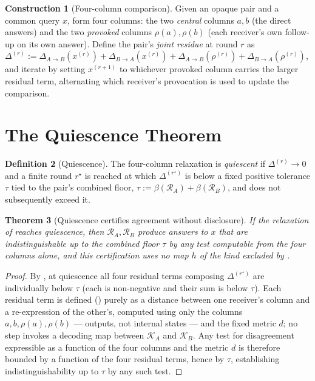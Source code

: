 \documentclass[11pt,twocolumn,a4paper]{article}
\theoremstyle{rdm}
\newtheorem{theorem}{Theorem}[section]
\theoremstyle{definition}
\newtheorem{definition}[theorem]{Definition}
\newtheorem{construction}[theorem]{Construction}
\theoremstyle{remark}
\newcommand{\flo}{\beta}
\newcommand{\Rec}{\mathcal{R}}
\newcommand{\Know}{\mathcal{K}}
\newcommand{\dem}{\Delta}
\begin{document}
\begin{construction}[Four-column comparison]
\label{con:four-col}
Given an opaque pair and a common query $x$, form four columns: the two
\emph{central} columns $a,b$ (the direct answers) and the two
\emph{provoked} columns $\rho(a),\rho(b)$ (each receiver's own follow-up on
its own answer). Define the pair's \emph{joint residue} at round $r$ as
$\dem^{(r)} := \dem_{A\to B}(x^{(r)}) + \dem_{B\to A}(x^{(r)}) +
\dem_{A\to B}(\rho^{(r)}) + \dem_{B\to A}(\rho^{(r)})$, and iterate by
setting $x^{(r+1)}$ to whichever provoked column carries the larger residual
term, alternating which receiver's provocation is used to update the
comparison.
\end{construction}

\section{The Quiescence Theorem}
\label{sec:quiescence}

\begin{definition}[Quiescence]
\label{def:quiescence-formal}
The four-column relaxation is \emph{quiescent} if $\dem^{(r)} \to 0$ and a
finite round $r^\star$ is reached at which $\dem^{(r^\star)}$ is below a
fixed positive tolerance $\tau$ tied to the pair's combined floor,
$\tau := \flo(\Rec_A)+\flo(\Rec_B)$, and does not subsequently exceed it.
\end{definition}

\begin{theorem}[Quiescence certifies agreement without disclosure]
\label{thm:quiescence-formal}
If the relaxation of  reaches quiescence, then
$\Rec_A,\Rec_B$ produce answers to $x$ that are indistinguishable up to the
combined floor $\tau$ by any test computable from the four columns alone,
and this certification uses no map $h$ of the kind excluded by
.
\end{theorem}

\begin{proof}
By , at quiescence all four residual terms
composing $\dem^{(r^\star)}$ are individually below $\tau$ (each is
non-negative and their sum is below $\tau$). Each residual term is defined
() purely as a distance between one receiver's column and
a re-expression of the other's, computed using only the columns
$a,b,\rho(a),\rho(b)$ --- outputs, not internal states --- and the fixed
metric $d$; no step invokes a decoding map between $\Know_A$ and $\Know_B$.
Any test for disagreement expressible as a function of the four columns and
the metric $d$ is therefore bounded by a function of the four residual
terms, hence by $\tau$, establishing indistinguishability up to $\tau$ by
any such test.
\end{proof}
\end{document}
